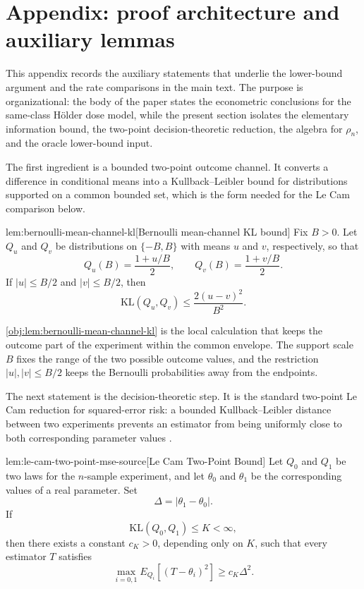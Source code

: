 \section{Appendix: proof architecture and auxiliary lemmas}

This appendix records the auxiliary statements that underlie the lower-bound argument and the rate comparisons in the main text. The purpose is organizational: the body of the paper states the econometric conclusions for the same-class Hölder dose model, while the present section isolates the elementary information bound, the two-point decision-theoretic reduction, the algebra for \(\rho_n\), and the oracle lower-bound input.

The first ingredient is a bounded two-point outcome channel. It converts a difference in conditional means into a Kullback--Leibler bound for distributions supported on a common bounded set, which is the form needed for the Le Cam comparison below.

\begin{lemmav}{lem:bernoulli-mean-channel-kl}[Bernoulli mean-channel KL bound]
Fix \(B>0\). Let \(Q_u\) and \(Q_v\) be distributions on \(\{-B,B\}\) with means \(u\) and \(v\), respectively, so that
\[
Q_u(B)=\frac{1+u/B}{2},
\qquad
Q_v(B)=\frac{1+v/B}{2}.
\]
If \(|u|\le B/2\) and \(|v|\le B/2\), then
\[
\mathrm{KL}(Q_u,Q_v)
\le
\frac{2(u-v)^2}{B^2}.
\]
\end{lemmav}

\cref{obj:lem:bernoulli-mean-channel-kl} is the local calculation that keeps the outcome part of the experiment within the common envelope. The support scale \(B\) fixes the range of the two possible outcome values, and the restriction \(|u|,|v|\le B/2\) keeps the Bernoulli probabilities away from the endpoints.

The next statement is the decision-theoretic step. It is the standard two-point Le Cam reduction for squared-error risk: a bounded Kullback--Leibler distance between two experiments prevents an estimator from being uniformly close to both corresponding parameter values \citep{tsybakov2009}.

\begin{lemmav}{lem:le-cam-two-point-mse-source}[Le Cam Two-Point Bound]
Let \(Q_0\) and \(Q_1\) be two laws for the \(n\)-sample experiment, and let \(\theta_0\) and \(\theta_1\) be the corresponding values of a real parameter. Set
\[
\Delta = |\theta_1-\theta_0|.
\]
If
\[
\mathrm{KL}(Q_0,Q_1)\le K<\infty,
\]
then there exists a constant \(c_K>0\), depending only on \(K\), such that every estimator \(T\) satisfies
\[
\max_{i=0,1} E_{Q_i}\!\left[(T-\theta_i)^2\right]\ge c_K \Delta^2 .
\]
\end{lemmav}

